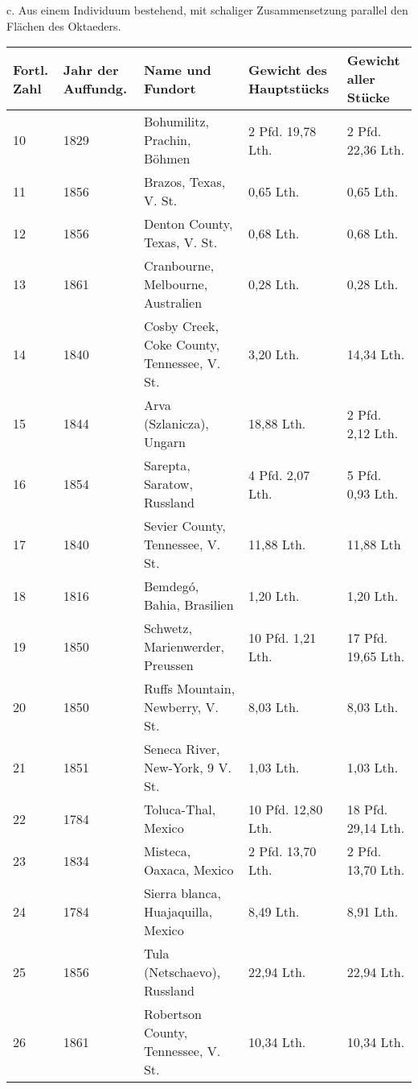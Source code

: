 \documentclass[a4paper, 11pt, oneside]{article}
\begin{document}
\clearpage
\begin{center}
c. Aus einem Individuum bestehend, mit schaliger Zusammensetzung parallel den Flächen des Oktaeders.
\end{center}
\begin{center}
\begin{footnotesize}
\begin{tabular}{ |p{7mm}|p{9mm}|p{45mm}|p{24mm}|p{24mm}| }
    \hline
    Fortl. Zahl & Jahr der Auffundg. & Name und Fundort & Gewicht des Hauptstücks & Gewicht aller Stücke\\
    \hline\hline
    10 & 1829 & Bohumilitz, Prachin, Böhmen & 2 Pfd. 19,78 Lth. & 2 Pfd. 22,36 Lth.\\\hline
    11 & 1856 & Brazos, Texas, V. St. & 0,65 Lth. & 0,65 Lth.\\\hline
    12 & 1856 & Denton County, Texas, V. St. & 0,68 Lth. & 0,68 Lth.\\\hline
    13 & 1861 & Cranbourne, Melbourne, Australien & 0,28 Lth. & 0,28 Lth.\\\hline
    14 & 1840 & Cosby Creek, Coke County, Tennessee, V. St. & 3,20 Lth. & 14,34 Lth.\\\hline
    15 & 1844 & Arva (Szlanicza), Ungarn & 18,88 Lth. & 2 Pfd. 2,12 Lth.\\\hline
    16 & 1854 & Sarepta, Saratow, Russland & 4 Pfd. 2,07 Lth. & 5 Pfd. 0,93 Lth.\\\hline
    17 & 1840 & Sevier County, Tennessee, V. St. & 11,88 Lth. & 11,88 Lth\\\hline
    18 & 1816 & Bemdegó, Bahia, Brasilien & 1,20 Lth. & 1,20 Lth.\\\hline
    19 & 1850 & Schwetz, Marienwerder, Preussen & 10 Pfd. 1,21 Lth. & 17 Pfd. 19,65 Lth.\\\hline
    20 & 1850 & Ruffs Mountain, Newberry, V. St. & 8,03 Lth. & 8,03 Lth.\\\hline
    21 & 1851 & Seneca River, New-York, 9 V. St. & 1,03 Lth. & 1,03 Lth.\\\hline
    22 & 1784 & Toluca-Thal, Mexico & 10 Pfd. 12,80 Lth. & 18 Pfd. 29,14 Lth.\\\hline
    23 & 1834 & Misteca, Oaxaca, Mexico & 2 Pfd. 13,70 Lth. & 2 Pfd. 13,70 Lth.\\\hline
    24 & 1784 & Sierra blanca, Huajaquilla, Mexico & 8,49 Lth. & 8,91 Lth.\\\hline
    25 & 1856 & Tula (Netschaevo), Russland & 22,94 Lth. & 22,94 Lth.\\\hline
    26 & 1861 & Robertson County, Tennessee, V. St. & 10,34 Lth. & 10,34 Lth.\\\hline

\end{tabular}
\end{footnotesize}
\end{center}
\end{document}
